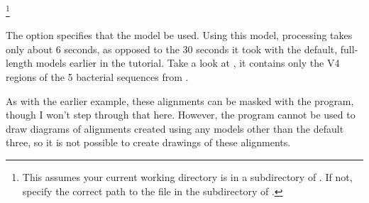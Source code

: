 \footnote{This assumes your
  current working directory is in a subdirectory of .
  If not, specify the correct path to the  file
  in the  subdirectory of .}

The  option specifies that the model  be used. 
Using this model, processing  takes only about 6
seconds, as opposed to the 30 seconds it took with the default,
full-length models earlier in the tutorial. Take a look at
, it contains only the V4 regions
of the 5 bacterial sequences from . 

As with the earlier example, these alignments can be masked with the
 program, though I won't step through that
here. However, the  program cannot be used to draw
diagrams of alignments created using any models other than the default
three, so it is not possible to create drawings of these alignments.


